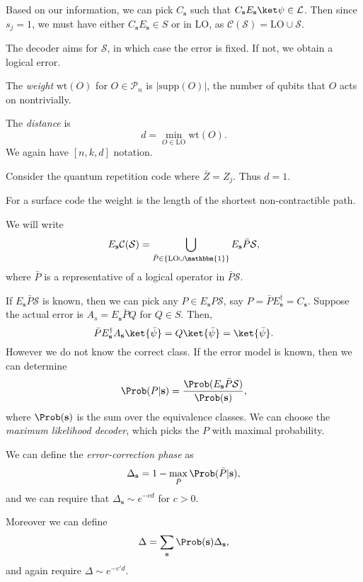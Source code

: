 \documentclass[12pt]{article}
\begin{document}
Based on our information, we can pick $C_{\mathbf{s}}$ such that $C_{\mathbf{s}} E_{\mathbf{s}} \ket \psi \in\mathcal{L}$. Then since $s_j = 1$, we must have either $C_{\mathbf{s}} E_{\mathbf{s}} \in S$ or in $\mathrm{LO}$, as $\mathcal{C}(\mathcal{S}) = \mathrm{LO} \cup \mathcal{S}$.

The decoder aims for $\mathcal{S}$, in which case the error is fixed. If not, we obtain a logical error.

The \emph{weight} $\mathrm{wt}(O)$ for $O \in \mathcal{P}_n$ is $|\mathrm{supp}(O)|$, the number of qubits that $O$ acts on nontrivially.

The \emph{distance} is
\[
d = \min_{O \in \mathrm{LO}} \mathrm{wt}(O).
\]
We again have $[n, k, d]$ notation.

\begin{exbox}
	Consider the quantum repetition code where $\bar Z = Z_j$. Thus $d = 1$.

	For a surface code the weight is the length of the shortest non-contractible path.
\end{exbox}

We will write
\[
E_{\mathbf{s}} \mathcal{C}(\mathcal{S}) = \bigcup_{\bar P \in 
\{\mathrm{LO} \cup \mathbbm{1}\}} E_{\mathbf{s}} \bar P \mathcal{S},
\]
where $\bar P$ is a representative of a logical operator in $\bar P \mathcal{S}$.

If $E_{\mathbf{s}} \bar P \mathcal{S}$ is known, then we can pick any $P \in E_{\mathbf{s}} P \mathcal{S}$, say $P = \bar P E_{\mathbf{s}}^{\dagger} = C_{\mathbf{s}}$. Suppose the actual error is $A_s = E_{\mathbf{s}} \bar P Q$ for $Q \in S$. Then,
\[
	\bar P E_{\mathbf{s}}^{\dagger} A_{\mathbf{s}} \ket{\bar \psi} = Q \ket{\bar \psi} = \ket{\bar \psi}.
\]
However we do not know the correct class. If the error model is known, then we can determine
\[
\Prob(P | \mathbf{s}) = \frac{\Prob(E_{\mathbf{s}} \bar P \mathcal{S})}{\Prob(\mathbf{s})},
\]
where $\Prob(\mathbf{s})$ is the sum over the equivalence classes. We can choose the \emph{maximum likelihood decoder}, which picks the $P$ with maximal probability.

We can define the \emph{error-correction phase} as
\[
\Delta_{\mathbf{s}} = 1 - \max_{\bar P} \Prob(\bar P|\mathbf{s}),
\]
and we can require that $\Delta_{\mathbf{s}} \sim e^{-cd}$ for $c > 0$.

Moreover we can define
\[
\Delta = \sum_{\mathbf{s}} \Prob(\mathbf{s}) \Delta_{\mathbf{s}},
\]
and again require $\Delta \sim e^{-c' d}$.
\end{document}
